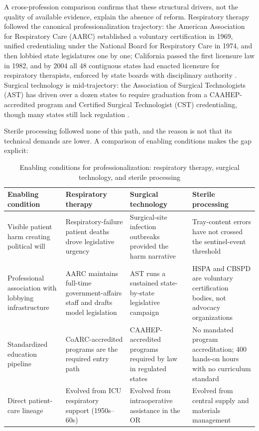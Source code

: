 \documentclass[10pt,a4paper]{article}
\begin{document}
A cross-profession comparison confirms that these structural drivers,
not the quality of available evidence, explain the absence of reform.
Respiratory therapy followed the canonical professionalization
trajectory: the American Association for Respiratory Care (AARC)
established a voluntary certification in 1969, unified credentialing
under the National Board for Respiratory Care in 1974, and then
lobbied state legislatures one by one; California passed the first
licensure law in 1982, and by 2004 all 48 contiguous states had
enacted licensure for respiratory therapists, enforced by state boards
with disciplinary authority
\cite{aarc-timeline}.
Surgical technology is mid-trajectory: the Association of Surgical
Technologists (AST) has driven over a dozen states to require
graduation from a CAAHEP-accredited program and Certified Surgical
Technologist (CST) credentialing, though many states still lack
regulation
\cite{ast-state-laws}.

Sterile processing followed none of this path, and the reason is not
that its technical demands are lower. A comparison of enabling
conditions makes the gap explicit:

\begin{table}[H]
\centering
\caption{Enabling conditions for professionalization: respiratory therapy, surgical technology, and sterile processing}
\label{tab:professionalization-enabling-conditions}
\small\renewcommand{\arraystretch}{1.2}\setlength{\tabcolsep}{4pt}
\begin{tabularx}{\textwidth}{|>{\raggedright\arraybackslash}p{2.5cm}|>{\raggedright\arraybackslash}X|>{\raggedright\arraybackslash}X|>{\raggedright\arraybackslash}X|}
\hline
Enabling condition & Respiratory therapy & Surgical technology & Sterile processing \\
\hline
Visible patient harm creating political will & Respiratory-failure patient deaths drove legislative urgency & Surgical-site infection outbreaks provided the harm narrative & Tray-content errors have not crossed the sentinel-event threshold \cite{joint-commission-sentinel-event-2024} \\
\hline
Professional association with lobbying infrastructure & AARC maintains full-time government-affairs staff and drafts model legislation \cite{aarc-timeline} & AST runs a sustained state-by-state legislative campaign \cite{ast-state-laws} & HSPA and CBSPD are voluntary certification bodies, not advocacy organizations \\
\hline
Standardized education pipeline & CoARC-accredited programs are the required entry path & CAAHEP-accredited programs required by law in regulated states & No mandated program accreditation; 400 hands-on hours with no curriculum standard \\
\hline
Direct patient-care lineage & Evolved from ICU respiratory support (1950s--60s) & Evolved from intraoperative assistance in the OR & Evolved from central supply and materials management \cite{ashcsp-central-service-history} \\
\hline
\end{tabularx}
\end{table}
\end{document}
